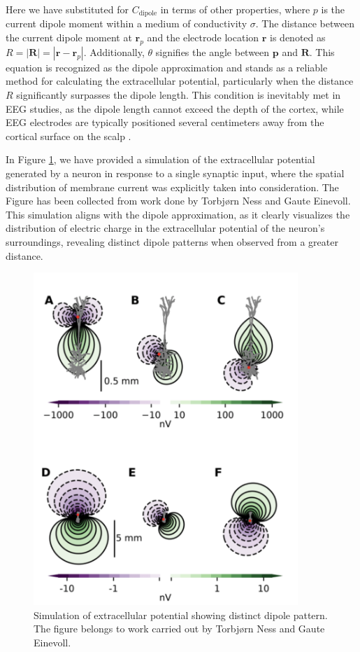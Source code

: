 \documentclass[a4paper, UKenglish, 11pt]{uiomaster}
\begin{document}
Here we have substituted for $C_\text{dipole}$ in terms of other properties, where $p$ is the current dipole moment within a medium of conductivity $\sigma$. The distance between the current dipole moment at $\textbf{r}_p$ and the electrode location $\textbf{r}$ is denoted as $R = |\textbf{R}| = |\textbf{r} - \textbf{r}_p|$.
Additionally, $\theta$ signifies the angle between $\textbf{p}$ and $\textbf{R}$. This equation is recognized as the dipole approximation and stands as a reliable method for calculating the extracellular potential, particularly when the distance $R$ significantly surpasses the dipole length.
This condition is inevitably met in EEG studies, as the dipole length cannot exceed the depth of the cortex, while EEG electrodes are typically positioned several centimeters away from the cortical surface on the scalp \cite{naess2021biophysically}.

In Figure \ref{fig:dipole_pattern}, we have provided a simulation of the extracellular potential generated by a neuron in response to a single synaptic input, where the spatial distribution of membrane current was explicitly taken into consideration. The Figure has been collected from work done by Torbjørn Ness and Gaute Einevoll. This simulation aligns with the dipole approximation, as it clearly visualizes the distribution of electric charge in the extracellular potential of the neuron's surroundings, revealing distinct dipole patterns when observed from a greater distance.

\begin{figure}
    \centering
    \includegraphics[width=10cm]{figures/dipole_pattern.png}
    \caption{Simulation of extracellular potential showing distinct dipole pattern. The figure belongs to work carried out by Torbjørn Ness and Gaute Einevoll.}
    \label{fig:dipole_pattern}
\end{figure}
\end{document}
